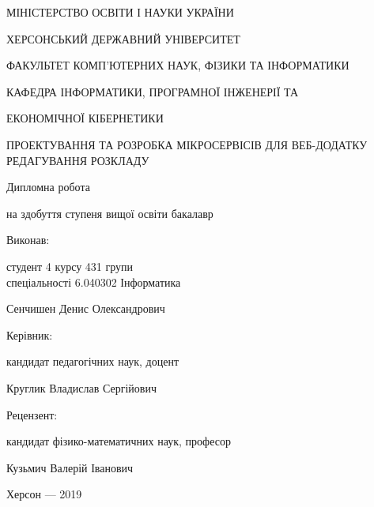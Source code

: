 \thispagestyle{empty}

{\centering
МІНІСТЕРСТВО ОСВІТИ І НАУКИ УКРАЇНИ

ХЕРСОНСЬКИЙ ДЕРЖАВНИЙ УНІВЕРСИТЕТ

ФАКУЛЬТЕТ КОМП'ЮТЕРНИХ НАУК, ФІЗИКИ ТА ІНФОРМАТИКИ

КАФЕДРА ІНФОРМАТИКИ, ПРОГРАМНОЇ ІНЖЕНЕРІЇ ТА 

ЕКОНОМІЧНОЇ КІБЕРНЕТИКИ

\vfill

ПРОЕКТУВАННЯ ТА РОЗРОБКА МІКРОСЕРВІСІВ ДЛЯ ВЕБ-ДОДАТКУ РЕДАГУВАННЯ РОЗКЛАДУ

Дипломна робота

на здобуття ступеня вищої освіти бакалавр

}

\vfill

\hfill\begin{minipage}[t]{0.6\textwidth}
Виконав: 

студент 4 курсу 431 групи \\ спеціальності 6.040302  Інформатика

Сенчишен Денис Олександрович

Керівник:

кандидат педагогічних наук, доцент

Круглик Владислав Сергійович

Рецензент:

кандидат фізико-математичних наук, професор

Кузьмич Валерій Іванович

\end{minipage}

\vfill

{\centering
Херсон --- 2019

}